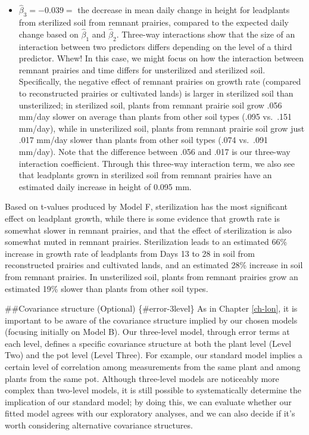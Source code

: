 \documentclass[
]{krantz}
\begin{document}
\begin{itemize}
\item
  \(\hat{\beta}_{3}=-0.039=\) the decrease in mean daily change in height for leadplants from sterilized soil from remnant prairies, compared to the expected daily change based on \(\hat{\beta}_{1}\) and \(\hat{\beta}_{2}\). Three-way interactions show that the size of an interaction between two predictors differs depending on the level of a third predictor. Whew! In this case, we might focus on how the interaction between remnant prairies and time differs for unsterilized and sterilized soil. Specifically, the negative effect of remnant prairies on growth rate (compared to reconstructed prairies or cultivated lands) is larger in sterilized soil than unsterilized; in sterilized soil, plants from remnant prairie soil grow .056 mm/day slower on average than plants from other soil types (.095 vs.~.151 mm/day), while in unsterilized soil, plants from remnant prairie soil grow just .017 mm/day slower than plants from other soil types (.074 vs.~.091 mm/day). Note that the difference between .056 and .017 is our three-way interaction coefficient. Through this three-way interaction term, we also see that leadplants grown in sterilized soil from remnant prairies have an estimated daily increase in height of 0.095 mm.
\end{itemize}

Based on t-values produced by Model F, sterilization has the most significant effect on leadplant growth, while there is some evidence that growth rate is somewhat slower in remnant prairies, and that the effect of sterilization is also somewhat muted in remnant prairies. Sterilization leads to an estimated 66\% increase in growth rate of leadplants from Days 13 to 28 in soil from reconstructed prairies and cultivated lands, and an estimated 28\% increase in soil from remnant prairies. In unsterilized soil, plants from remnant prairies grow an estimated 19\% slower than plants from other soil types.

\#\#Covariance structure (Optional) \{\#error-3level\}
As in Chapter \ref{ch-lon}, it is important to be aware of the covariance structure implied by our chosen models (focusing initially on Model B). Our three-level model, through error terms at each level, defines a specific covariance structure at both the plant level (Level Two) and the pot level (Level Three). For example, our standard model implies a certain level of correlation among measurements from the same plant and among plants from the same pot. Although three-level models are noticeably more complex than two-level models, it is still possible to systematically determine the implication of our standard model; by doing this, we can evaluate whether our fitted model agrees with our exploratory analyses, and we can also decide if it's worth considering alternative covariance structures.
\end{document}
